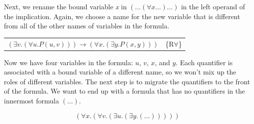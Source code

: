 {{Next, we rename the bound variable \emph{x} in $(\dots(\forall x\dots)\dots)$
in the left operand of the implication. Again, we choose a name for the new variable
that is different from all of the other names of variables in the formula.

\begin{center}
\begin{tabular}{ll}
$(\exists v. (\forall u. P(u, v))) \rightarrow (\forall x. (\exists y. P(x, y)))$ & \{R$\forall$\} \\
\end{tabular}
\end{center}

Now we have four variables in the formula: $u$, $v$, $x$, and $y$.
Each quantifier is associated with a bound variable of a different name,
so we won't mix up the roles of different variables.
The next step is to migrate the quantifiers to the front of the formula.
We want to end up with a formula that has no quantifiers
in the innermost formula $( \dots )$.

$$(\forall x.(\forall v.(\exists u.(\exists y.( \dots )))))$$

}}
